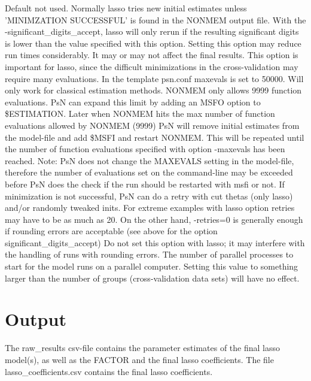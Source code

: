 
\begin{optionlist}
Default not used. Normally lasso tries new initial estimates unless 'MINIMZATION SUCCESSFUL' is found in the NONMEM output file. With the -significant\_digits\_accept, lasso will only rerun if the resulting significant digits is lower than the value specified with this option. Setting this option may reduce run times considerably. It may or may not affect the final results. 
\nextopt
{}
This option is important for lasso, since the difficult minimizations in the cross-validation may require many evaluations. In the template psn.conf maxevals is set to 50000. Will only work for classical estimation methods. NONMEM only allows 9999 function evaluations. PsN can expand this limit by adding an MSFO option to \$ESTIMATION. Later when NONMEM hits the max number of function evaluations allowed by NONMEM (9999) PsN will remove initial estimates from the model-file and add \$MSFI and restart NONMEM. This will be repeated until the number of function evaluations specified with option -maxevals has been reached. Note: PsN does not change the MAXEVALS setting in the model-file, therefore the number of evaluations set on the command-line may be exceeded before PsN does the check if the run should be restarted with msfi or not. 
\nextopt
{}
If minimization is not successful, PsN can do a retry with cut thetas (only lasso) and/or randomly tweaked inits. For extreme examples with lasso option retries may have to be as much as 20. On the other hand, -retries=0 is generally enough if rounding errors are acceptable (see above for the option significant\_digits\_accept) 
\nextopt
{}
Do not set this option with lasso; it may interfere with the handling of runs with rounding errors. 
\nextopt
{}
The number of parallel processes to start for the model runs on a parallel computer. Setting this value to something larger than the number of groups (cross-validation data sets) will have no effect. 
\nextopt
\end{optionlist}

\section{Output}
The raw\_results csv-file contains the parameter estimates of the final lasso model(s), as well as the FACTOR and
the final lasso coefficients. The file lasso\_coefficients.csv contains the final lasso coefficients.

